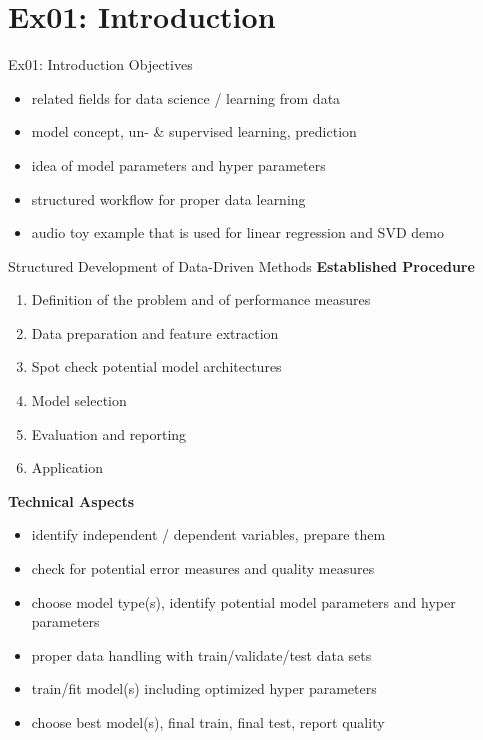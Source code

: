 \documentclass[mathserif, aspectratio=1610]{intbeamer}
\begin{document}
\section{Ex01: Introduction}
\begin{frame}{Ex01: Introduction}
Objectives
\begin{itemize}
\item related fields for data science / learning from data
\item model concept, un- \& supervised learning, prediction
\item idea of model parameters and hyper parameters
\item structured workflow for proper data learning
\item audio toy example that is used for linear regression and SVD demo
\end{itemize}
\end{frame}

\begin{frame}{Structured Development of Data-Driven Methods}
\textbf{Established Procedure}
\begin{enumerate}
\item Definition of the problem and of performance measures
\item Data preparation and feature extraction
\item Spot check potential model architectures
\item Model selection
\item Evaluation and reporting
\item Application
\end{enumerate}
\textbf{Technical Aspects}
\begin{itemize}
\item identify independent / dependent variables, prepare them
\item check for potential error measures and quality measures
\item choose model type(s), identify potential model parameters and hyper parameters
\item proper data handling with train/validate/test data sets
\item train/fit model(s) including optimized hyper parameters
\item choose best model(s), final train, final test, report quality
\end{itemize}
\end{frame}
\end{document}
